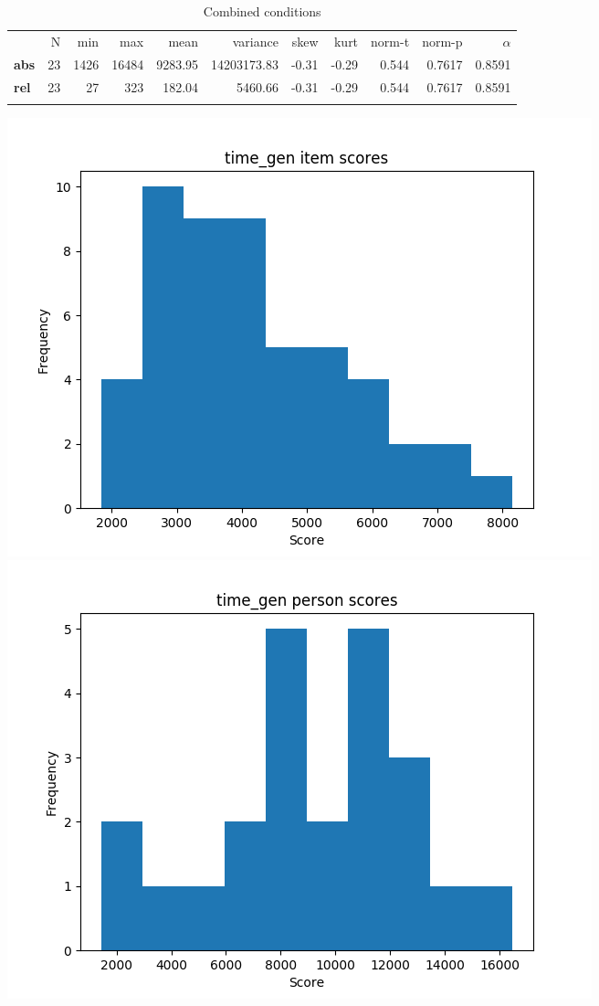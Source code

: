 \begin{longtable}[c]{@{}lrrrrrrrrrr@{}}
\caption{Combined conditions}
\endfirsthead
\toprule\addlinespace
& N & min & max & mean & variance & skew & kurt & norm-t &
norm-p & $\alpha$
\\\addlinespace
\midrule
\textbf{abs} & 23 & 1426 & 16484 & 9283.95 & 14203173.83 & -0.31 & -0.29
& 0.544 & 0.7617 & 0.8591
\\\addlinespace
\textbf{rel} & 23 & 27 & 323 & 182.04 & 5460.66 & -0.31 & -0.29 & 0.544
& 0.7617 & 0.8591
\\\addlinespace
\bottomrule
\end{longtable}

\includegraphics{img/time_gen_diff.png} \includegraphics{img/time_gen_abil.png}

